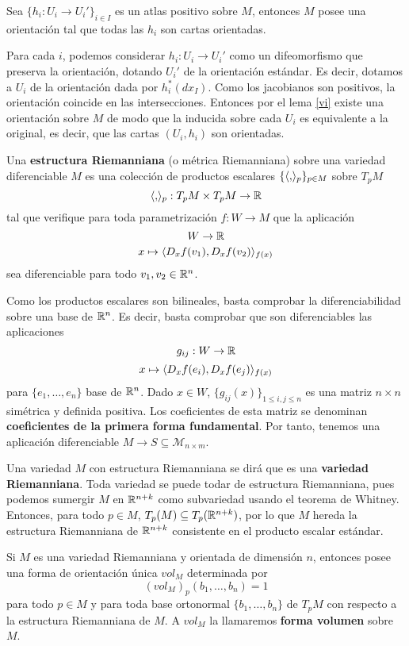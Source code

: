 \documentclass[CV.tex]{subfiles}
\begin{document}
\begin{prop}\label{9.14}
Sea $\{h_i:U_i\to U_i'\}_{i\in I}$ es un atlas positivo sobre $M$, entonces $M$ posee una orientación tal que todas las $h_i$ son cartas orientadas.
\end{prop}
\begin{dem}
Para cada $i$, podemos considerar $h_i:U_i\to U_i'$ como un difeomorfismo que preserva la orientación, dotando $U_i'$ de la orientación estándar. Es decir, dotamos a $U_i$ de la orientación dada por $h_i^*(dx_I)$. Como los jacobianos son positivos, la orientación coincide en las intersecciones. Entonces por el lema \ref{vi} existe una orientación sobre $M$ de modo que la inducida sobre cada $U_i$ es equivalente a la original, es decir, que las cartas $(U_i,h_i)$ son orientadas.
\QED
\end{dem}


\begin{defi}
Una \textbf{estructura Riemanniana} (o métrica Riemanniana) sobre una variedad diferenciable $M$ es una colección de productos escalares $\{\langle{,}\rangle_p\}_{p\in M}$ sobre $T_pM$
\[
\langle{,}\rangle_p:T_pM\times T_pM\to\mathbb{R}
\] 
tal que verifique para toda parametrización $f:W\to M$ que la aplicación
\[
W\to\mathbb{R}
\]
\[
x\mapsto \langle{D_xf(v_1),D_xf(v_2)}\rangle_{f(x)}
\]
sea diferenciable para todo $v_1,v_2\in\mathbb{R}^n$.
\end{defi}

Como los productos escalares son bilineales, basta comprobar la diferenciabilidad sobre una base de $\mathbb{R}^n$.  Es decir, basta comprobar que son diferenciables las aplicaciones
\[
g_{ij}:W\to \mathbb{R}
\]
\[
x\mapsto \langle{D_x f(e_i),D_xf(e_j)}\rangle_{f(x)}
\]
para $\{e_1,\dots, e_n\}$ base de $\mathbb{R}^n$. Dado $x\in W$, $\{g_{ij}(x)\}_{1\leq i,j\leq n}$ es una matriz $n\times n$ simétrica y definida positiva. Los coeficientes de esta matriz se denominan \textbf{coeficientes de la primera forma fundamental}. Por tanto, tenemos una aplicación diferenciable $M\to S\subseteq \mathcal{M}_{n\times m}$.  

Una variedad $M$ con estructura Riemanniana se dirá que es una \textbf{variedad Riemanniana}. Toda variedad se puede todar de estructura Riemanniana, pues podemos sumergir $M$ en $\mathbb{R}^{n+k}$ como subvariedad usando el teorema de Whitney. Entonces, para todo $p\in M$, $T_p(M)\subseteq T_p(\mathbb{R}^{n+k})$, por lo que $M$ hereda la estructura Riemanniana de $\mathbb{R}^{n+k}$ consistente en el producto escalar estándar.


\begin{prop}
Si $M$ es una variedad Riemanniana y orientada de dimensión $n$, entonces posee una forma de orientación única $vol_M$ determinada por
\[
(vol_M)_p(b_1,\dots, b_n)=1
\]
para todo $p\in M$ y para toda base ortonormal $\{b_1,\dots, b_n\}$ de $T_pM$ con respecto a la estructura Riemanniana de $M$. A $vol_M$ la llamaremos \textbf{forma volumen} sobre $M$.
\end{prop}
\end{document}
